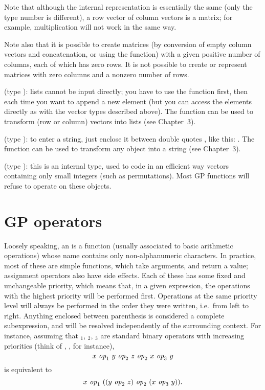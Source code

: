 Note that although the internal representation is essentially the same (only
the type number is different), a row vector of column vectors is 
a matrix; for example, multiplication will not work in the same way.

Note also that it is possible to create matrices (by conversion of empty
column vectors and concatenation, or using the  function) with a
given positive number of columns, each of which has zero rows. It is not
possible to create or represent matrices with zero columns and a nonzero
number of rows.

 (type ): lists cannot be input
directly; you have to use the function  first, then
 each time you want to append a new element (but you can
access the elements directly as with the vector types described above). The
function  can be used to transform (row or column) vectors into
lists (see Chapter~3).

 (type ):
to enter a string, just enclose it between double quotes , like
this: . The function  can be used to
transform any object into a string (see Chapter~3).

 (type ): this is an internal type,
used to code in an efficient way vectors containing only small integers (such
as permutations). Most GP functions will refuse to operate on these objects.

\section{GP operators}\label{se:operators}

\noindent
Loosely speaking, an  is a function (usually associated to
basic arithmetic operations) whose name contains only non-alphanumeric
characters. In practice, most of these are simple functions, which take
arguments, and return a value; assignment operators also have side effects.
Each of these has some fixed and unchangeable priority, which means that,
in a given expression, the operations with the highest priority will be
performed first. Operations at the same priority level will always be
performed in the order they were written, i.e.~from left to right. Anything
enclosed between parenthesis is considered a complete subexpression, and
will be resolved independently of the surrounding context. For instance,
assuming that $_1$, $_2$, $_3$ are standard binary
operators with increasing priorities (think of \kbd{+}, \kbd{*}, \kbd{\pow}
for instance),
$$ x~\hbox{\it op\/}_1~y~\hbox{\it op\/}_2~z~\hbox{\it op\/}_2~x~\hbox{\it op\/}_3~y $$
is equivalent to
$$ x~\hbox{\it op\/}_1~((y~\hbox{\it op\/}_2~z)~\hbox{\it op\/}_2~ (x~\hbox{\it op\/}_3~y)).$$

